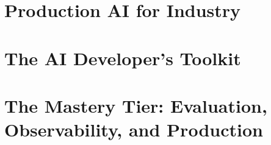 \documentclass[11pt,a4paper,oneside]{book}
\begin{document}
\part{Production AI for Industry}



\part{The AI Developer's Toolkit}


\part{The Mastery Tier: Evaluation, Observability, and Production}







\appendix

\end{document}
